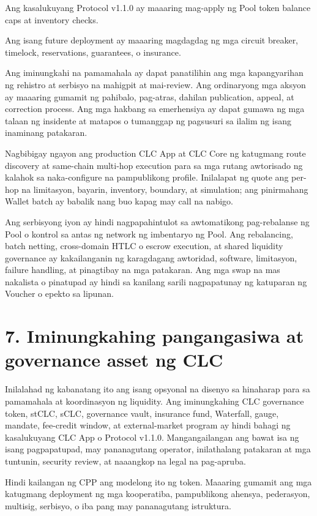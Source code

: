 \documentclass[11pt]{article}
\begin{document}
Ang kasalukuyang Protocol v1.1.0 ay maaaring mag-apply ng Pool token balance caps at inventory checks.

Ang isang future deployment ay maaaring magdagdag ng mga circuit breaker, timelock, reservations, guarantees, o insurance.

Ang iminungkahi na pamamahala ay dapat panatilihin ang mga kapangyarihan ng rehistro at serbisyo na mahigpit at mai-review. Ang ordinaryong mga aksyon ay maaaring gumamit ng pahibalo, pag-atras, dahilan publication, appeal, at correction process. Ang mga hakbang sa emerhensiya ay dapat gumawa ng mga talaan ng insidente at matapos o tumanggap ng pagsusuri sa ilalim ng isang inaminang patakaran.

Nagbibigay ngayon ang production CLC App at CLC Core ng katugmang route discovery at same-chain multi-hop execution para sa mga rutang awtorisado ng kalahok sa naka-configure na pampublikong profile. Inilalapat ng quote ang per-hop na limitasyon, bayarin, inventory, boundary, at simulation; ang pinirmahang Wallet batch ay babalik nang buo kapag may call na nabigo.

Ang serbisyong iyon ay hindi nagpapahintulot sa awtomatikong pag-rebalanse ng Pool o kontrol sa antas ng network ng imbentaryo ng Pool. Ang rebalancing, batch netting, cross-domain HTLC o escrow execution, at shared liquidity governance ay kakailanganin ng karagdagang awtoridad, software, limitasyon, failure handling, at pinagtibay na mga patakaran. Ang mga swap na mas nakalista o pinatupad ay hindi sa kanilang sarili nagpapatunay ng katuparan ng Voucher o epekto sa lipunan.


\section*{7. Iminungkahing pangangasiwa at governance asset ng CLC}

Inilalahad ng kabanatang ito ang isang opsyonal na disenyo sa hinaharap para sa pamamahala at koordinasyon ng liquidity. Ang iminungkahing CLC governance token, stCLC, sCLC, governance vault, insurance fund, Waterfall, gauge, mandate, fee-credit window, at external-market program ay hindi bahagi ng kasalukuyang CLC App o Protocol v1.1.0. Mangangailangan ang bawat isa ng isang pagpapatupad, may pananagutang operator, inilathalang patakaran at mga tuntunin, security review, at naaangkop na legal na pag-apruba.

Hindi kailangan ng CPP ang modelong ito ng token. Maaaring gumamit ang mga katugmang deployment ng mga kooperatiba, pampublikong ahensya, pederasyon, multisig, serbisyo, o iba pang may pananagutang istruktura.
\end{document}
